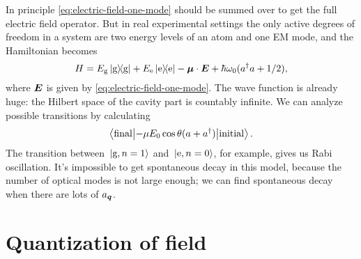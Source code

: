 \documentclass[hyperref, a4paper]{article}
\begin{document}
In principle \eqref{eq:electric-field-one-mode} should be summed over 
to get the full electric field operator.
But in real experimental settings 
the only active degrees of freedom in a system 
are two energy levels of an atom and one EM mode,
and the Hamiltonian becomes 
\begin{equation}
    H = E_\text{g} \dyad{\text{g}} + E_{\text{e}} \dyad{\text{e}} 
    - \vb*{\mu} \cdot \vb*{E} 
    + \hbar \omega_0 (a^\dagger a + 1/2),
\end{equation}
where $\vb*{E}$ is given by \eqref{eq:electric-field-one-mode}.
The wave function is already huge: 
the Hilbert space of the cavity part is countably infinite.
We can analyze possible transitions by calculating 
\begin{equation}
    \mel**{\text{final}}{- \mu E_0 \cos \theta (a + a^\dagger)}{\text{initial}}.
\end{equation} 
The transition between $\ket*{\text{g}, n = 1}$ and $\ket*{\text{e}, n = 0}$,
for example, gives us Rabi oscillation.
It's impossible to get spontaneous decay in this model, 
because the number of optical modes is not large enough;
we can find spontaneous decay when there are lots of $a_{\vb*{q}}$.

\section{Quantization of field}
\end{document}
